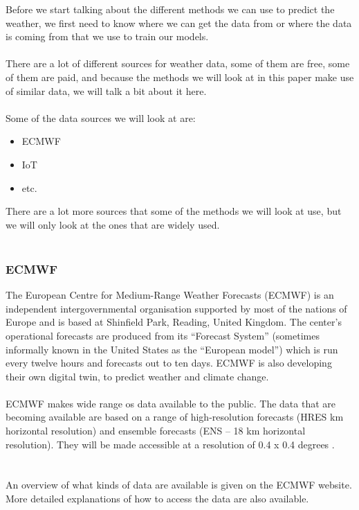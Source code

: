 \documentclass[../paper.tex]{subfiles}
\begin{document}
    Before we start talking about the different methods we can use to predict the weather, we first need to know where we can get the data from or where the data is coming from that we use to train our models.
    \\\\
    There are a lot of different sources for weather data, some of them are free, some of them are paid, and because the methods we will look at in this paper make use of similar data, we will talk a bit about it here.
    \\\\
    Some of the data sources we will look at are:
    \begin{itemize}
        \item ECMWF
        \item IoT
        \item etc.
    \end{itemize}
    There are a lot more sources that some of the methods we will look at use, but we will only look at the ones that are widely used.
    \\\\
    \subsubsection{ECMWF}
    The European Centre for Medium-Range Weather Forecasts (ECMWF) is an independent intergovernmental organisation supported by most of the nations of Europe and is based at Shinfield Park, Reading, United Kingdom.
    The center's operational forecasts are produced from its ``Forecast System'' (sometimes informally known in the United States as the ``European model'') which is run every twelve hours and forecasts out to ten days\cite{b4}.
    ECMWF is also developing their own digital twin, to predict weather and climate change\cite{b5}.
    \\\\
    ECMWF makes wide range os data available to the public.
    The data that are becoming available are based on a range of high-resolution forecasts (HRES  km horizontal resolution) and ensemble forecasts (ENS – 18 km horizontal resolution). They will be made accessible at a resolution of 0.4 x 0.4 degrees \cite{ecmwf_data_free}.\\
    \\\\
    An overview of what kinds of data are available is given on the ECMWF website.
    More detailed explanations of how to access the data are also available\cite{ecmwf_data_free}.\\
\end{document}
